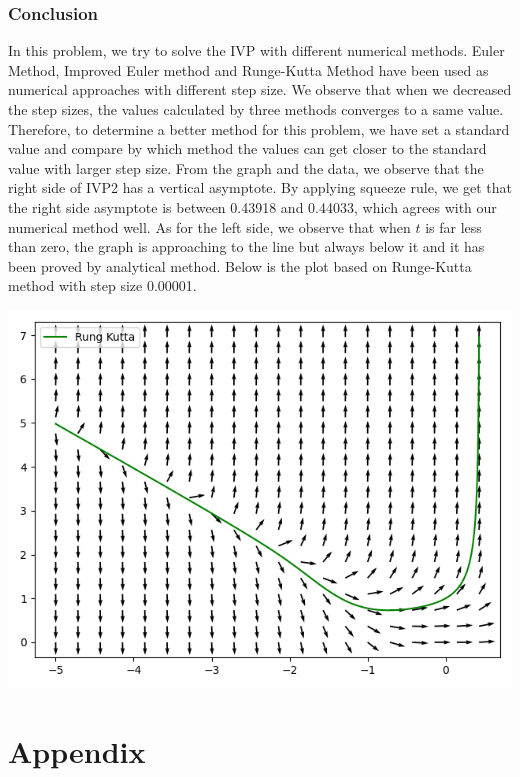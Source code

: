 \documentclass[11pt,a4paper]{article}
\begin{document}
\subsubsection{Conclusion}

In this problem, we try to solve the IVP with different numerical methods. Euler Method, Improved Euler method and Runge-Kutta Method have been used as numerical approaches with different step size. We observe that when we decreased the step sizes, the values calculated by three methods converges to a same value. Therefore, to determine a better method for this problem, we have set a standard value and compare by which method the values can get closer to the standard value with larger step size. 
From the graph and the data, we observe that the right side of IVP2 has a vertical asymptote. By applying squeeze rule, we get that the right side asymptote is between 0.43918 and 0.44033, which agrees with our numerical method well. As for the left side, we observe that when $t$ is far less than zero, the graph is approaching to the line but always below it and it has been proved by analytical method. 
Below is the plot based on Runge-Kutta method with step size 0.00001. 

\begin{center}
	\includegraphics[scale=0.3]{P2FinalSolution.png}
\end{center}

\newpage

\section{Appendix}
\end{document}
